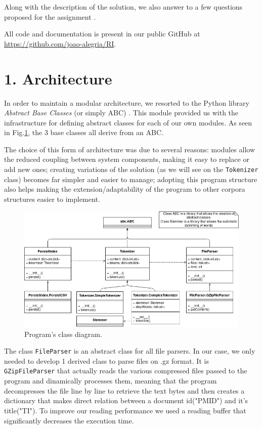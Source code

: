 \documentclass[12pt]{article}
\begin{document}
Along with the description of the solution, we also answer to a few questions
proposed for the assignment \cite{assign1}.

All code and documentation is present in our public GitHub at 
\newline \url{https://github.com/joao-alegria/RI}.

\newpage
\section*{1. Architecture}

In order to maintain a modular architecture, we resorted to the Python library 
{\it Abstract Base Classes\/} (or simply ABC) \cite{abclib}.
This module provided us with the infrastructure for defining abstract classes
for each of our own modules.
As seen in Fig.\ref{fig:classdiagram}, the 3 base classes all derive from 
an ABC.

The choice of this form of architecture was due to several reasons: modules
allow the reduced coupling between system components, making it easy to replace
or add new ones; creating variations of the solution (as we will see on the
\texttt{Tokenizer} class) becomes far simpler and easier to manage; adopting this 
program structure also helps making the extension/adaptability of the 
program to other corpora structures easier to implement.

\begin{figure}[h!]
  \includegraphics[width=\linewidth]{ClassDiagram.png}
  \caption{Program's class diagram.}
  \label{fig:classdiagram}
\end{figure}

The class \texttt{FileParser} is an abstract class for all file parsers.
In our case, we only needed to develop 1 derived class to parse files on
.gz format. 
It is \texttt{GZipFileParser} that actually reads the various compressed 
files passed to the program and dinamically processes them, meaning that
the program decompresses the file line by line to retrieve the text bytes 
and then creates a dictionary that makes direct relation between a document 
id("PMID") and it's title("TI").
To improve our reading performance we used a reading buffer that 
significantly decreases the execution time. 
\end{document}
